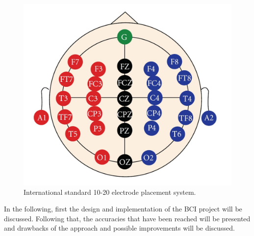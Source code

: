 \documentclass[a4paper,twoside, openright,12pt]{report}
\begin{document}
\begin{figure}[h]
	\centering
	\includegraphics[width=0.5\linewidth]{./gfx/10-20.jpg}
	\caption{International standard 10-20 electrode placement system.}
	\label{fig:10-20-system}
\end{figure}



In the following, first the design and implementation of the BCI project will be discussed. Following that, the accuracies that have been reached will be presented and drawbacks of the approach and possible improvements will be discussed.







\end{document}
